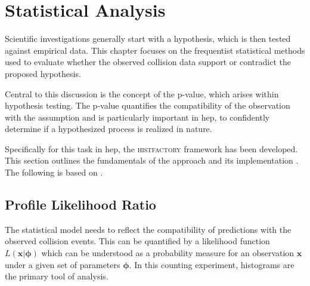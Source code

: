 \chapter{Statistical Analysis}\label{sec:statistics}
Scientific investigations generally start with a hypothesis, which is then tested against empirical data. This chapter focuses on the frequentist statistical methods used to evaluate whether the observed collision data support or contradict the proposed hypothesis.

Central to this discussion is the concept of the p-value, which arises within hypothesis testing. The p-value quantifies the compatibility of the observation with the assumption and is particularly important in \ac{hep}, to confidently determine if a hypothesized process is realized in nature.

Specifically for this task in \ac{hep}, the \textsc{histfactory} framework has been developed. This section outlines the fundamentals of the approach and its implementation \citep{pyhf,pyhf_joss}. The following is based on \citep{cowan2011asymptotic,behnke2013data,pyhf}.


\section{Profile Likelihood Ratio}\label{sec:likelihood}
The statistical model needs to reflect the compatibility of predictions with the observed collision events. This can be quantified by a likelihood function $L(\bm{x} | \bm{\phi})$ which can be understood as a probability measure for an observation $\bm{x}$ under a given set of parameters $\bm{\phi}$. In this counting experiment, histograms are the primary tool of analysis.


